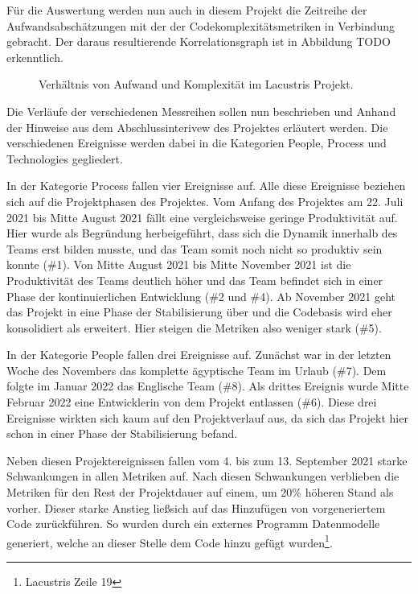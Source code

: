 Für die Auswertung werden nun auch in diesem Projekt die Zeitreihe der
Aufwandsabschätzungen mit der der Codekomplexitätsmetriken in Verbindung
gebracht. Der daraus resultierende Korrelationsgraph ist in Abbildung TODO
erkenntlich.

\begin{figure}\label{lacustris-graph}
  \begin{center}
      
  \end{center}
  \caption{Verhältnis von Aufwand und Komplexität im Lacustris Projekt.}
\end{figure}


Die Verläufe der verschiedenen Messreihen sollen nun beschrieben und
Anhand der Hinweise aus dem Abschlussinterivew des Projektes erläutert
werden. Die verschiedenen Ereignisse werden dabei in die Kategorien
People, Process und Technologies gegliedert.

In der Kategorie Process fallen vier Ereignisse auf. Alle diese
Ereignisse beziehen sich auf die Projektphasen des Projektes. Vom Anfang
des Projektes am 22. Juli 2021 bis Mitte August 2021 fällt eine
vergleichsweise geringe Produktivität auf. Hier wurde als Begründung
herbeigeführt, dass sich die Dynamik innerhalb des Teams erst bilden
musste, und das Team somit noch nicht so produktiv sein konnte (\#1). Von Mitte August 2021 bis Mitte
November 2021 ist die Produktivität des Teams deutlich höher und das
Team befindet sich in einer Phase der kontinuierlichen Entwicklung (\#2
und \#4). Ab November 2021
geht das Projekt in eine Phase der Stabilisierung über und die Codebasis
wird eher konsolidiert als erweitert. Hier steigen die Metriken also
weniger stark (\#5).

In der Kategorie People fallen drei Ereignisse auf. Zunächst war in der
letzten Woche des Novembers das komplette ägyptische Team im Urlaub (\#7). Dem folgte im Januar 2022 das Englische Team
(\#8). Als drittes Ereignis wurde Mitte Februar
2022 eine Entwicklerin von dem Projekt entlassen (\#6). Diese drei Ereignisse wirkten sich kaum auf
den Projektverlauf aus, da sich das Projekt hier schon in einer Phase
der Stabilisierung befand.

Neben diesen Projektereignissen fallen vom 4. bis zum 13. September 2021
starke Schwankungen in allen Metriken auf. Nach diesen Schwankungen
verblieben die Metriken für den Rest der Projektdauer auf einem, um 20\%
höheren Stand als vorher. Dieser starke Anstieg lie\ss  sich auf das
Hinzufügen von vorgeneriertem Code zurückführen. So wurden durch ein
externes Programm Datenmodelle generiert, welche an dieser Stelle dem
Code hinzu gefügt wurden\footnote{Lacustris Zeile 19}.

